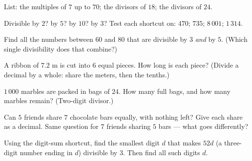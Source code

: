 \begin{exercise}[$\star$]\label{exo:g5:division:5}
List: the multiples of $7$ up to $70$; the divisors of $18$; the
divisors of $24$.
\end{exercise}

\begin{exercise}[$\star$]\label{exo:g5:division:6}
Divisible by $2$? by $5$? by $10$? by $3$? Test each shortcut on:
$470$; \quad $735$; \quad $8\,001$; \quad $1\,314$.
\end{exercise}

\begin{exercise}[$\star$]\label{exo:g5:division:7}
Find all the numbers between $60$ and $80$ that are divisible by
$3$ \emph{and} by $5$. (Which single divisibility does that
combine?)
\end{exercise}

\begin{exercise}[$\star$]\label{exo:g5:division:8}
A ribbon of $7.2$ m is cut into $6$ equal pieces. How long is each
piece? (Divide a decimal by a whole: share the meters, then the
tenths.)
\end{exercise}

\begin{exercise}[$\star$]\label{exo:g5:division:9}
$1\,000$ marbles are packed in bags of $24$. How many full bags, and
how many marbles remain? (Two-digit divisor.)
\end{exercise}

\begin{exercise}[$\star\star$]\label{exo:g5:division:10}
Can $5$ friends share $7$ chocolate bars equally, with nothing left?
Give each share as a decimal. Same question for $7$ friends sharing
$5$ bars --- what goes differently?
\end{exercise}

\begin{exercise}[$\star\star$]\label{exo:g5:division:11}
Using the digit-sum shortcut, find the smallest digit $d$ that makes
$52d$ (a three-digit number ending in $d$) divisible by $3$. Then
find all such digits $d$.
\end{exercise}
